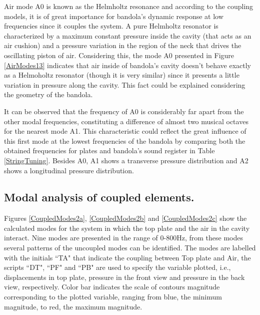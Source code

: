 Air mode A0 is known as the Helmholtz resonance and according to the coupling models, it is of great importance for bandola's dynamic response at low frequencies since it couples the system. A pure Helmholtz resonator is characterized by a maximum constant pressure inside the cavity (that acts as an air cushion) and a pressure variation in the region of the neck that drives the oscillating piston of air. Considering this, the mode A0 presented in Figure \ref{AirModes13} indicates that air inside of bandola's cavity doesn't behave exactly as a Helmoholtz resonator (though it is very similar) since it presents a little variation in pressure along the cavity. This fact could be explained considering the geometry of the bandola.

It can be observed that the frequency of A0 is considerably far apart from the other modal frequencies, constituting a difference of almost two musical octaves for the nearest mode A1. This characteristic could reflect the great influence of this first mode at the lowest frequencies of the bandola by comparing both the obtained frequencies for plates and bandola's sound register in Table \ref{StringTuning}. Besides A0, A1 shows a transverse pressure distribution and A2 shows a longitudinal pressure distribution.

\subsection{Modal analysis of coupled elements.}

Figures \ref{CoupledModes2a}, \ref{CoupledModes2b} and \ref{CoupledModes2c} show the calculated modes for the system in which the top plate and the air in the cavity interact. Nine modes are presented in the range of 0-800Hz, from these modes several patterns of the uncoupled modes can be identified. The modes are labelled with the initials ``TA" that indicate the coupling between Top plate and Air, the scripts ``DT", ``PF" and ``PB" are used to specify the variable plotted, i.e., displacements in top plate, pressure in the front view and pressure in the back view, respectively. Color bar indicates the scale of contours magnitude corresponding to the plotted variable, ranging from blue, the minimum magnitude, to red, the maximum magnitude.


